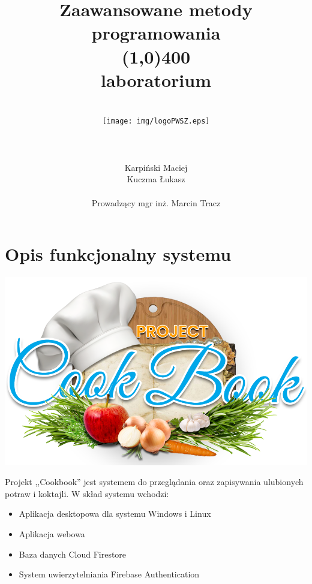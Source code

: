 \documentclass[12pt,a4paper]{article}
\author{
	\\\texttt{[image: img/logoPWSZ.eps]} \\\\\\\\
	\hfill Karpiński Maciej\\
	\hfill Kuczma Łukasz\\\\
	\hfill Prowadzący mgr inż. Marcin Tracz
	}
\title{\textbf{Zaawansowane metody programowania}\\\line(1,0){400}\\\textbf{laboratorium}}
\date{}
\begin{document}
	\maketitle
	\thispagestyle{fancy}
	\fancyhf{}
	\rhead{\textcolor{gray}{\footnotesize Państwowa Wyższa Szkoła Zawodowa im. Witelona w Legnicy\\Informatyka, rok III\\Semestr letni 2020/2021}}	
	\renewcommand{\headrulewidth}{0pt}
	\clearpage

	\pagestyle{fancy}
	\rfoot{\thepage}	
	\tableofcontents
	\newpage

	\section{Opis funkcjonalny systemu}	
		\includegraphics[width=0.7\linewidth]{img/logo.png}
		
		\indent Projekt ,,Cookbook'' jest systemem do przeglądania oraz zapisywania ulubionych potraw i koktajli. W skład systemu wchodzi:
		\begin{itemize}
			\item Aplikacja desktopowa dla systemu Windows i Linux
			\item Aplikacja webowa
			\item Baza danych Cloud Firestore
			\item System uwierzytelniania Firebase Authentication
		\end{itemize}
		
\end{document}
